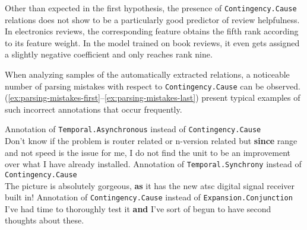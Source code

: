 \documentclass[
    a4paper,%
    12pt,%
    oneside,%
    toc=bibliography,
    final,
]{scrartcl}
\begin{document}
\begin{table}[h!]
	\centering
	
	\caption{Comparison of selected linguistic features between reviews including and reviews without \lstinline|Expansion.Conjunction| relations in book reviews}
	\label{tab:conjunction-features-books}
	
	\begin{threeparttable}
	\renewcommand{\arraystretch}{1.5}
	
	\end{threeparttable}

\end{table}

Other than expected in the first hypothesis, the presence of \lstinline|Contingency.Cause| relations does not show to be a particularly good predictor of review helpfulness. In electronics reviews, the corresponding feature obtains the fifth rank according to its feature weight. In the model trained on book reviews, it even gets assigned a slightly negative coefficient and only reaches rank nine.

When analyzing samples of the automatically extracted relations, a noticeable number of parsing mistakes with respect to \lstinline|Contingency.Cause| can be observed. (\ref{ex:parsing-mistakes-first}–\ref{ex:parsing-mistakes-last}) present typical examples of such incorrect annotations that occur frequently.

\begin{exe}
\ex \label{ex:parsing-mistakes-first} Annotation of \lstinline|Temporal.Asynchronous| instead of \lstinline|Contingency.Cause|\\
Don't know if the problem is router related or n-version related but \textbf{since} range and not speed is the issue for me, I do not find the unit to be an improvement over what I have already installed.
\ex Annotation of \lstinline|Temporal.Synchrony| instead of \lstinline|Contingency.Cause|\\
The picture is absolutely gorgeous, \textbf{as} it has the new atsc digital signal receiver built in!
\ex \label{ex:parsing-mistakes-last} Annotation of \lstinline|Contingency.Cause| instead of \lstinline|Expansion.Conjunction|\\
I've had time to thoroughly test it \textbf{and} I've sort of begun to have second thoughts about these.
\end{exe}
\end{document}
